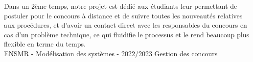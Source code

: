 Dans un 2ème temps, notre projet est dédié aux étudiants leur permettant de postuler 
pour le concours à distance  et de suivre toutes les nouveautés relatives aux 
procédures, et d'avoir un contact direct avec les responsables du concours en cas 
d'un problème technique, ce qui fluidifie le processus et le rend beaucoup plus 
flexible en terme du temps.\vfill
\noindent\makebox[\linewidth]{\rule{.8\paperwidth}{.6pt}}\\[0.2cm]
ENSMR - Modélisation des systèmes - 2022/2023 \hfill Gestion des concours
\noindent\makebox[\linewidth]{\rule{.8\paperwidth}{.6pt}}
\newpage